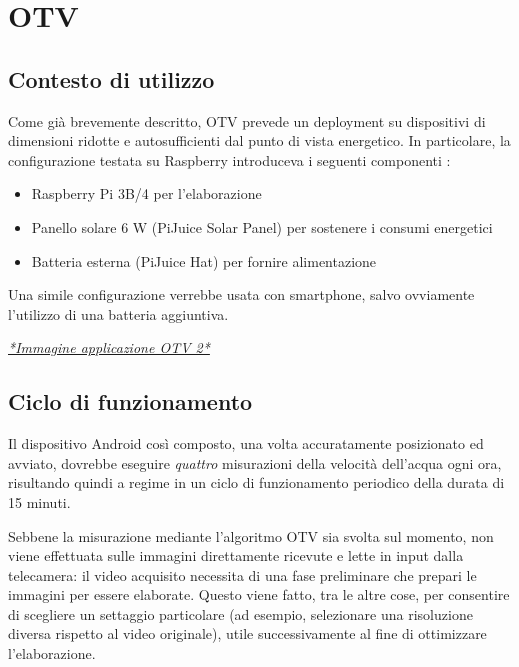 \chapter{OTV}
\section{Contesto di utilizzo}

Come già brevemente descritto, OTV prevede un deployment su dispositivi di dimensioni ridotte e autosufficienti dal punto di
vista energetico. In particolare, la configurazione testata su Raspberry introduceva i seguenti componenti \cite{app11157027}:
\begin{itemize}
    \item Raspberry Pi 3B/4 per l'elaborazione
    \item Panello solare 6 W (PiJuice Solar Panel) per sostenere i consumi energetici
    \item Batteria esterna (PiJuice Hat) per fornire alimentazione
\end{itemize}
 Una simile configurazione verrebbe usata con smartphone, salvo ovviamente l'utilizzo di una batteria 
aggiuntiva.

\underline{\emph{*Immagine applicazione OTV 2*}}

\section{Ciclo di funzionamento}
\label{sec:ciclo}

Il dispositivo Android così composto, una volta accuratamente posizionato ed avviato, dovrebbe eseguire \emph{quattro} misurazioni 
della velocità dell'acqua ogni ora, risultando quindi a regime in un ciclo di funzionamento periodico della durata di 15 minuti.

Sebbene la misurazione mediante l'algoritmo OTV sia svolta sul momento, non viene effettuata sulle immagini direttamente ricevute
e lette in input dalla telecamera: il video acquisito necessita di una fase preliminare che prepari le immagini per essere elaborate.
Questo viene fatto, tra le altre cose, per consentire di scegliere un settaggio particolare (ad esempio, selezionare una 
risoluzione diversa rispetto al video originale), utile successivamente al fine di ottimizzare l'elaborazione.

